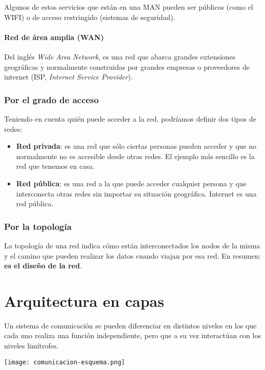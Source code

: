 Algunos de estos servicios que están en una MAN pueden ser públicos (como el WIFI) o de acceso restringido (sistemas de seguridad).

\subsubsection{Red de área amplia (WAN)}
Del inglés \textit{Wide Area Network}, es una red que abarca grandes extensiones geográficas y normalmente construidas por grandes empresas o proveedores de internet (ISP, \textit{Internet Service Provider}).


\subsection{Por el grado de acceso}
Teniendo en cuenta quién puede acceder a la red, podríamos definir dos tipos de redes:

\begin{itemize}
    \item \textbf{Red privada}: es una red que sólo ciertas personas pueden acceder y que no normalmente no es accesible desde otras redes. El ejemplo más sencillo es la red que tenemos en casa.
    \item \textbf{Red pública}: es una red a la que puede acceder cualquier persona y que interconecta otras redes sin importar su situación geográfica. Internet es una red pública.
\end{itemize}

\subsection{Por la topología}
La topología de una red indica cómo están interconectados los nodos de la misma y el camino que pueden realizar los datos cuando viajan por esa red. En resumen: \textbf{es el diseño de la red}.







\chapter{Arquitectura en capas}
Un sistema de comunicación se pueden diferenciar en distintos niveles en los que cada uno realiza una función independiente, pero que a su vez interactúan con los niveles limítrofes.

\begin{center}
    \vspace{-10pt}
    \texttt{[image: comunicacion-esquema.png]}
    \vspace{-10pt}
\end{center}

